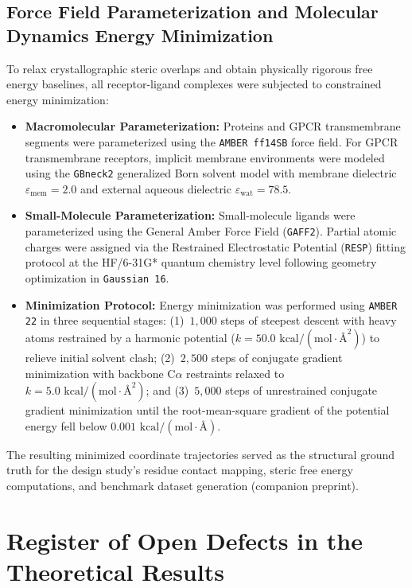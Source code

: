 \documentclass{article}
\theoremstyle{definition}
\begin{document}
\subsection{Force Field Parameterization and Molecular Dynamics Energy Minimization}
To relax crystallographic steric overlaps and obtain physically rigorous free energy baselines, all receptor-ligand complexes were subjected to constrained energy minimization:
\begin{itemize}
    \item \textbf{Macromolecular Parameterization:} Proteins and GPCR transmembrane segments were parameterized using the \texttt{AMBER ff14SB} force field. For GPCR transmembrane receptors, implicit membrane environments were modeled using the \texttt{GBneck2} generalized Born solvent model with membrane dielectric $\varepsilon_{\mathrm{mem}} = 2.0$ and external aqueous dielectric $\varepsilon_{\mathrm{wat}} = 78.5$.
    \item \textbf{Small-Molecule Parameterization:} Small-molecule ligands were parameterized using the General Amber Force Field (\texttt{GAFF2}). Partial atomic charges were assigned via the Restrained Electrostatic Potential (\texttt{RESP}) fitting protocol at the HF/6-31G* quantum chemistry level following geometry optimization in \texttt{Gaussian 16}.
    \item \textbf{Minimization Protocol:} Energy minimization was performed using \texttt{AMBER 22} in three sequential stages: (1)~$1,000$ steps of steepest descent with heavy atoms restrained by a harmonic potential ($k = 50.0\text{ kcal}/(\text{mol}\cdot\text{\AA}^2)$) to relieve initial solvent clash; (2)~$2,500$ steps of conjugate gradient minimization with backbone $\text{C}\alpha$ restraints relaxed to $k = 5.0\text{ kcal}/(\text{mol}\cdot\text{\AA}^2)$; and (3)~$5,000$ steps of unrestrained conjugate gradient minimization until the root-mean-square gradient of the potential energy fell below $0.001\text{ kcal}/(\text{mol}\cdot\text{\AA})$.
\end{itemize}
The resulting minimized coordinate trajectories served as the structural ground truth for the design study's residue contact mapping, steric free energy computations, and benchmark dataset generation (companion preprint).

\section{Register of Open Defects in the Theoretical Results}
\label{sec:theory_defects}
\end{document}
